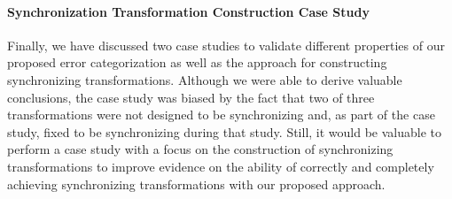 \paragraph{Synchronization Transformation Construction Case Study}
Finally,  we have discussed two case studies to validate different properties of our proposed error categorization as well as the approach for constructing synchronizing transformations.
Although we were able to derive valuable conclusions, the case study was biased by the fact that two of three transformations were not designed to be synchronizing and, as part of the case study, fixed to be synchronizing during that study.
Still, it would be valuable to perform a case study with a focus on the construction of synchronizing transformations to improve evidence on the ability of correctly and completely achieving synchronizing transformations with our proposed approach.





